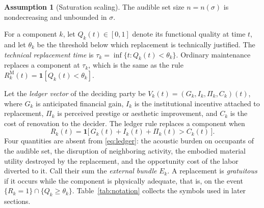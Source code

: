 \documentclass[11pt]{article}
\theoremstyle{definition}
\newtheorem{assumption}[theorem]{Assumption}
\theoremstyle{remark}
\newcommand{\ind}{\mathbf{1}}
\begin{document}
\begin{assumption}[Saturation scaling]\label{as:scaling}
The audible set size $n = n(\sigma)$ is nondecreasing and unbounded in $\sigma$.
\end{assumption}

For a component $k$, let $Q_k(t)\in[0,1]$ denote its functional quality at time $t$, and let $\theta_k$ be the threshold below which replacement is technically justified. The \emph{technical replacement time} is $\tau_k = \inf\{t : Q_k(t) < \theta_k\}$. Ordinary maintenance replaces a component at $\tau_k$, which is the same as the rule $R^{\mathrm{M}}_k(t) = \ind[Q_k(t) < \theta_k]$.

Let the \emph{ledger vector} of the deciding party be $V_k(t) = (G_k, I_k, \Pi_k, C_k)(t)$, where $G_k$ is anticipated financial gain, $I_k$ is the institutional incentive attached to replacement, $\Pi_k$ is perceived prestige or aesthetic improvement, and $C_k$ is the cost of renovation to the decider. The ledger rule replaces a component when
\begin{equation}\label{eq:ledger}
R_k(t) = \ind\bigl[\,G_k(t) + I_k(t) + \Pi_k(t) > C_k(t)\,\bigr].
\end{equation}
Four quantities are absent from \eqref{eq:ledger}: the acoustic burden on occupants of the audible set, the disruption of neighboring activity, the embodied material utility destroyed by the replacement, and the opportunity cost of the labor diverted to it. Call their sum the \emph{external bundle} $E_k$. A replacement is \emph{gratuitous} if it occurs while the component is physically adequate, that is, on the event $\{R_k = 1\}\cap\{Q_k \ge \theta_k\}$. Table~\ref{tab:notation} collects the symbols used in later sections.
\end{document}
